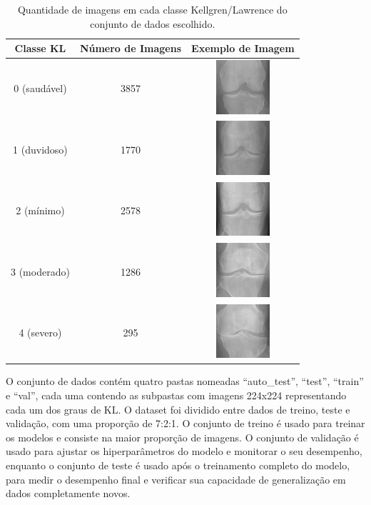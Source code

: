 \begin{table}[htbp]
    \centering
    \begin{tabular}{|c|c|c|}
        \hline
        \textbf{Classe KL} & \textbf{Número de Imagens} & \textbf{Exemplo de Imagem} \\
        \hline
        0 (saudável) & 3857 & \includegraphics[width=2cm]{figs/KL0-sample.png} \\
        \hline
        1 (duvidoso) & 1770 & \includegraphics[width=2cm]{figs/KL1-sample.png} \\
        \hline
        2 (mínimo) & 2578 & \includegraphics[width=2cm]{figs/KL2-sample.png} \\
        \hline
        3 (moderado) & 1286 & \includegraphics[width=2cm]{figs/KL3-sample.png} \\
        \hline
        4 (severo) & 295 & \includegraphics[width=2cm]{figs/KL4-sample.png} \\
        \hline
    \end{tabular}
    \caption{Quantidade de imagens em cada classe Kellgren/Lawrence do conjunto de dados escolhido.}
    \label{tabela-dataset}
\end{table}

O conjunto de dados contém quatro pastas nomeadas ``auto\_test'', ``test'', ``train'' e ``val'', cada uma contendo as subpastas com imagens 224x224 representando cada um dos graus de KL. O dataset foi dividido entre dados de treino, teste e validação, com uma proporção de 7:2:1. O conjunto de treino é usado para treinar os modelos e consiste na maior proporção de imagens. O conjunto de validação é usado para ajustar os hiperparâmetros do modelo e monitorar o seu desempenho, enquanto o conjunto de teste é usado após o treinamento completo do modelo, para medir o desempenho final e verificar sua capacidade de generalização em dados completamente novos.

